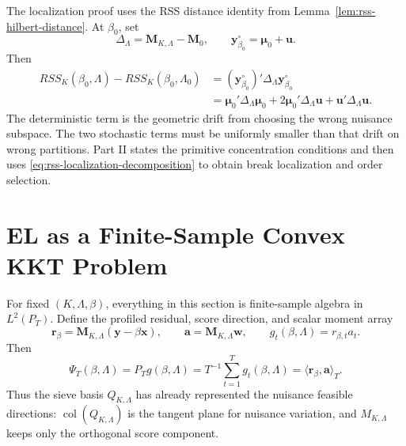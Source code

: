 \documentclass[12pt]{article}
\numberwithin{equation}{section}
\theoremstyle{definition}
\newcommand{\LtwoT}{L^2(P_T)}
\newcommand{\innerT}[2]{\langle #1,#2\rangle_T}
\begin{document}
The localization proof uses the RSS distance identity from
Lemma~\ref{lem:rss-hilbert-distance}. At \(\beta_0\), set
\[
    \Delta_\Lambda=\bm M_{K,\Lambda}-\bm M_0,
    \qquad
    \bm y_{\beta_0}^\circ=\bm\mu_0+\bm u.
\]
Then
\begin{equation}
\begin{aligned}
    RSS_K(\beta_0,\Lambda)-RSS_K(\beta_0,\Lambda_0)
    &=(\bm y_{\beta_0}^\circ)'\Delta_\Lambda\bm y_{\beta_0}^\circ \\
    &=\bm\mu_0'\Delta_\Lambda\bm\mu_0
      +2\bm\mu_0'\Delta_\Lambda\bm u
      +\bm u'\Delta_\Lambda\bm u.
\end{aligned}
\label{eq:rss-localization-decomposition}
\end{equation}
The deterministic term is the geometric drift from choosing the wrong nuisance
subspace. The two stochastic terms must be uniformly smaller than that drift on
wrong partitions. Part II states the primitive concentration conditions and then
uses \eqref{eq:rss-localization-decomposition} to obtain break localization and
order selection.
\section{EL as a Finite-Sample Convex KKT Problem}

For fixed \((K,\Lambda,\beta)\), everything in this section is finite-sample
algebra in \(\LtwoT\). Define the profiled residual, score direction, and scalar
moment array
\[
    \bm r_\beta=\bm M_{K,\Lambda}(\bm y-\beta\bm x),
    \qquad
    \bm a=\bm M_{K,\Lambda}\bm w,
    \qquad
    g_t(\beta,\Lambda)=r_{\beta,t}a_t.
\]
Then
\[
    \Psi_T(\beta,\Lambda)=P_Tg(\beta,\Lambda)
    =T^{-1}\sum_{t=1}^Tg_t(\beta,\Lambda)
    =\innerT{\bm r_\beta}{\bm a}.
\]
Thus the sieve basis \(Q_{K,\Lambda}\) has already represented the nuisance
feasible directions: \(\operatorname{col}(Q_{K,\Lambda})\) is the tangent plane
for nuisance variation, and \(M_{K,\Lambda}\) keeps only the orthogonal score
component.
\end{document}
